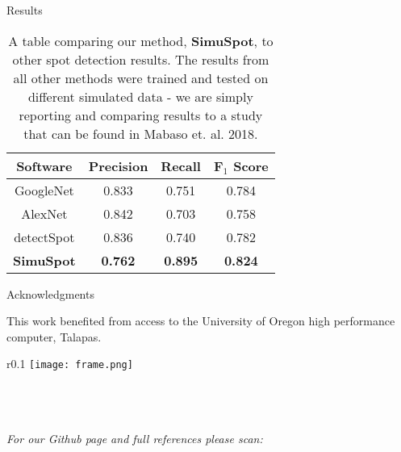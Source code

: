 \documentclass[final]{beamer}
\newlength{\onecolwid}
\begin{document}
\begin{frame}[t]
\begin{columns}[t]
\begin{column}{\onecolwid}
\begin{block}{Results}
    \begin{table}[h]
        \setlength{\tabcolsep}{40pt}
        \centering
        \begin{tabular}{|c|c|c|c|}
            \hline
            Software & Precision & Recall & F$_1$ Score \\
            \hline
            GoogleNet & 0.833 & 0.751 & 0.784 \\
            \hline
            AlexNet & 0.842 & 0.703 & 0.758 \\
            \hline
            detectSpot & 0.836 & 0.740 & 0.782 \\
            \hline
            \textbf{SimuSpot} & \textbf{0.762}  & \textbf{0.895} & \textbf{0.824} \\
            \hline
        \end{tabular}
        \vspace{.3in}
        \caption{ A table comparing our method, \textbf{SimuSpot}, to other spot detection results. The results from all other methods were trained and tested on different simulated data - we are simply reporting and comparing results to a study that can be found in Mabaso et. al. 2018.}
    \end{table}

    \begin{block}{Acknowledgments}

  This work benefited from access to the University of Oregon high performance computer, Talapas.
   
   \begin{wrapfigure}{r}{0.1\textwidth}
            \texttt{[image: frame.png]}
        \end{wrapfigure}
        
  \phantom{a}\\\phantom{a}\\\phantom{a}\\\hspace{2in}\textit{For our Github page and full references please scan:}
    \end{block}

\end{block}
\end{column}

\end{columns}
\end{frame} %
\end{document}
